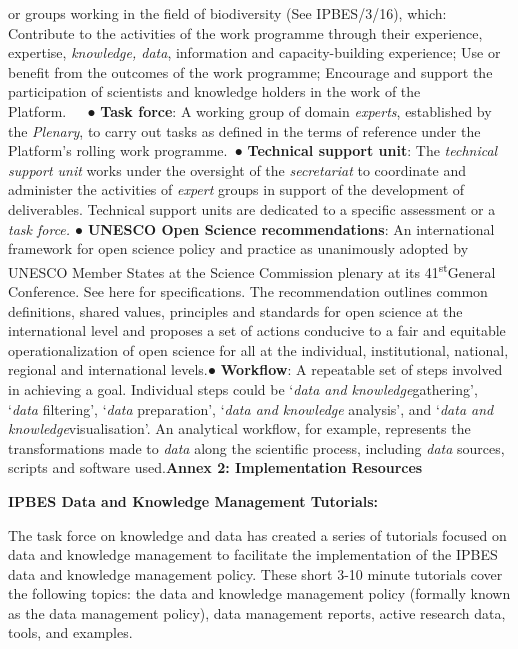\documentclass{article}
\begin{document}
or groups working in the field of biodiversity (See IPBES/3/16), which: Contribute to the activities of the work programme through their experience, expertise, \textit{knowledge, data}, information and capacity-building experience; Use or benefit from the outcomes of the work programme; Encourage and support the participation of scientists and knowledge holders in the work of the Platform.   ● \textbf{Task force}: A working group of domain \textit{experts}, established by the \textit{Plenary}, to carry out tasks as defined in the terms of reference under the Platform’s rolling work programme. ● \textbf{Technical support unit}: The\textit{ technical support unit} works under the oversight of the \textit{secretariat }to coordinate and administer the activities of \textit{expert }groups in support of the development of deliverables. Technical support units are dedicated to a specific assessment or a \textit{task force.} ● \textbf{UNESCO Open Science recommendations}: An international framework for open science policy and practice as unanimously adopted by UNESCO Member States at the Science Commission plenary at its 41\textsuperscript{st}General Conference. See here for specifications. The recommendation outlines common definitions, shared values, principles and standards for open science at the international level and proposes a set of actions conducive to a fair and equitable operationalization of open science for all at the individual, institutional, national, regional and international levels.● \textbf{Workflow}: A repeatable set of steps involved in achieving a goal. Individual steps could be ‘\textit{data and knowledge}gathering’, ‘\textit{data} filtering’, ‘\textit{data} preparation’, ‘\textit{data and knowledge} analysis’, and ‘\textit{data and knowledge}visualisation’. An analytical workflow, for example, represents the transformations made to \textit{data} along the scientific process, including \textit{data} sources, scripts and software used.\textbf{Annex 2: Implementation Resources }

\textbf{IPBES Data and Knowledge Management Tutorials: }

The task force on knowledge and data has created a series of tutorials focused on data and knowledge management to facilitate the implementation of the IPBES data and knowledge management policy. These short 3-10 minute tutorials cover the following topics: the data and knowledge management policy (formally known as the data management policy), data management reports, active research data, tools, and examples. 
\end{document}
